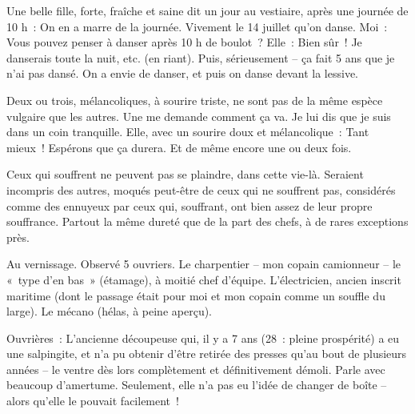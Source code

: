\documentclass[french,twoside]{book} %
\begin{document}
Une belle fille, forte, fraîche et saine dit un jour au vestiaire, après une journée de 10 h : On en a marre de la journée. Vivement le 14 juillet qu'on danse. Moi : Vous pouvez penser à danser après 10 h de boulot ? Elle : Bien sûr ! Je danserais toute la nuit, etc. (en riant). Puis, sérieusement – ça fait 5 ans que je n'ai pas dansé. On a envie de danser, et puis on danse devant la lessive.\par
Deux ou trois, mélancoliques, à sourire triste, ne sont pas de la même espèce vulgaire que les autres. Une me demande comment ça va. Je lui dis que je suis dans un coin tranquille. Elle, avec un sourire doux et mélancolique : Tant mieux ! Espérons que ça durera. Et de même encore une ou deux fois.\par
Ceux qui souffrent ne peuvent pas se plaindre, dans cette vie-là. Seraient incompris des autres, moqués peut-être de ceux qui ne souffrent pas, considérés comme des ennuyeux par ceux qui, souffrant, ont bien assez de leur propre souffrance. Partout la même dureté que de la part des chefs, à de rares exceptions près.\par
Au vernissage. Observé 5 ouvriers. Le charpentier – mon copain camionneur – le « type d'en bas » (étamage), à moitié chef d'équipe. L'électricien, ancien inscrit maritime (dont le passage était pour moi et mon copain comme un souffle du large). Le mécano (hélas, à peine aperçu).\par
[Remarque : séparation des sexes, mépris des hommes pour les femmes, réserve des femmes à l'égard des hommes (malgré les échanges de plaisanteries obscènes) bien plus prononcés chez les ouvriers qu'ailleurs.]\par
Ouvrières : L'ancienne découpeuse qui, il y a 7 ans (28 : pleine prospérité) a eu une salpingite, et n'a pu obtenir d'être retirée des presses qu'au bout de plusieurs années – le ventre dès lors complètement et définitivement démoli. Parle avec beaucoup d'amertume. Seulement, elle n'a pas eu l'idée de changer de boîte – alors qu'elle le pouvait facilement !
\end{document}
